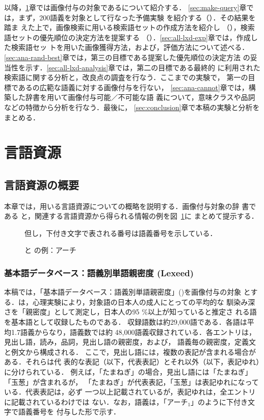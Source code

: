 \documentclass[japanese]{jnlp_1.4}
\newcommand{\refsec}[1]{}
\newcommand{\lxd}{}
\newcommand{\hk}{}
\begin{document}
以降，\ref{sec:resource}章では画像付与の対象である\lxd{}について紹介する．
\ref{sec:make-query}章では，まず，200語義を対象として行なった予備実験
\cite{Fujita:Nagata:2010}を紹介する（\refsec{sec:pre-exp}）．その結果を踏ま
えた上で，画像検索に用いる検索語セットの作成方法を紹介し
（\refsec{sec:queryset}），検索語セットの優先順位の決定方法を提案する
（\refsec{sec:query-order}）．\ref{sec:all-lxd-exp}章では，作成した検索語セッ
トを用いた画像獲得方法，および，評価方法について述べる．
\ref{sec:ana-rand-best}章では，第三の目標である提案した優先順位の決定方法
の妥当性を示す．\ref{sec:all-lxd-analysis}章では，第二の目標である最終的
に利用された検索語に関する分析と，改良点の調査を行なう．ここまでの実験で，
第一の目標である\lxd{}の広範な語義に対する画像付与を行ない，
\ref{sec:ana-cannot}章では，構築した辞書を用いて画像付与可能／不可能な語
義について，意味クラスや品詞などの特徴から分析を行なう．最後に，
\ref{sec:conclusion}章で本稿の実験と分析をまとめる．



\section{言語資源} \label{sec:resource}


\subsection{言語資源の概要} \label{sec:lexeed}

本章では，用いる言語資源についての概略を説明する．画像付与対象の辞
書である
\lxd{}と，関連する言語資源から得られる情報の例を図~\ref{fig:arch-lxd}に
まとめて提示する．

\begin{figure}[t]

\vspace{0.5zw}\small 但し，下付き文字で表される番号は語義番号を示している．\par
\caption{\lxd と \hk の例：アーチ}
\label{fig:arch-lxd}
\end{figure}


\subsubsection{基本語データベース：語義別単語親密度 (Lexeed)} 

本稿では，「基本語データベース：語義別単語親密度」(\lxd{})を画像付与の対象
とする．\lxd{}は，心理実験により，対象語の日本人の成人にとっての平均的な
馴染み深さを「親密度」として測定し，日本人の95 \%以上が知っていると推定さ
れる語を基本語として収録したものである．
収録語数は約29,000語である．各語は平均1.7語義からなり，語義数では約
48,000語義収録されている．各エントリは，見出し語，読み，品詞，見出し語の親密度，および，
語義毎の親密度，定義文と例文から構成される．
ここで，見出し語には，複数の表記が含まれる場合がある．それらは代
表的な表記（以下，代表表記）とそれ以外（以下，表記ゆれ）に分けられている．
例えば，「たまねぎ」の場合，見出し語には「たまねぎ」「玉葱」が含まれるが，
「たまねぎ」が代表表記，「玉葱」は表記ゆれになっている．代表表記は，必ず
一つ以上記載されているが，表記ゆれは，全エントリに記載されているわけでは
ない．なお，語義は，「アーチ$_1$」のように下付き文字で語義番号を
付与した形で示す．
\end{document}

